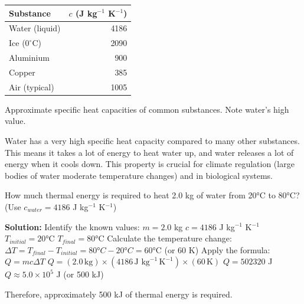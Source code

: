 
\begin{marginfigure}[-10pt]
\centering
\small %
\begin{tabular}{lr}
\toprule
Substance & \(c\) (J kg\(^{-1}\) K\(^{-1}\)) \\
\midrule
Water (liquid) & 4186 \\
Ice (\(0^\circ\)C) & 2090 \\
Aluminium & 900 \\
Copper & 385 \\
Air (typical) & 1005 \\
\bottomrule
\end{tabular}
\caption{Approximate specific heat capacities of common substances. Note water's high value.}
\label{tab:specific_heat}
\end{marginfigure}

Water has a very high specific heat capacity compared to many other substances. This means it takes a lot of energy to heat water up, and water releases a lot of energy when it cools down. This property is crucial for climate regulation (large bodies of water moderate temperature changes) and in biological systems.

\begin{example}
How much thermal energy is required to heat 2.0 kg of water from 20°C to 80°C? (Use \(c_{water} = 4186\) J kg\(^{-1}\) K\(^{-1}\))

\textbf{Solution:}
Identify the known values:
\(m = 2.0\) kg
\(c = 4186\) J kg\(^{-1}\) K\(^{-1}\)
\(T_{initial} = 20\)°C
\(T_{final} = 80\)°C
Calculate the temperature change:
\(\Delta T = T_{final} - T_{initial} = 80°C - 20°C = 60\)°C (or 60 K)
Apply the formula:
\(Q = mc\Delta T\)
\(Q = (2.0\,\text{kg}) \times (4186\,\text{J kg}^{-1}\,\text{K}^{-1}) \times (60\,\text{K})\)
\(Q = 502320\) J
\(Q \approx 5.0 \times 10^5\) J (or 500 kJ)

Therefore, approximately 500 kJ of thermal energy is required.
\end{example}

